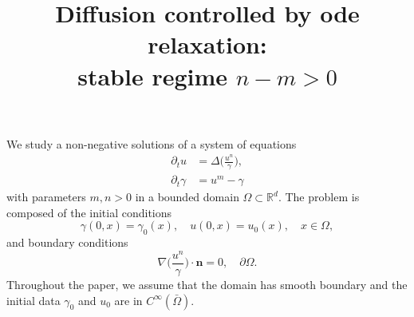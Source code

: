 \documentclass[a4paper,11pt]{article}
\theoremstyle{remark}
\begin{document}
\title{Diffusion controlled by ode relaxation:\\stable regime $n-m>0$}
\date{}

\maketitle

\renewcommand{\thefootnote}{\arabic{footnote}}

\maketitle

\begin{abstract}
\end{abstract}

\tableofcontents
\pagebreak 
 
We study a non-negative solutions of a system of equations
\begin{equation}\label{ug_system}
\begin{aligned}
 \partial_t u &= \Delta \Big(\frac{u^n}{\gamma}\Big),\\
 \partial_t \gamma &= u^m - \gamma
\end{aligned}
\end{equation}
with parameters $m,n>0$ in a bounded domain $\Omega\subset \mathbb{R}^d$. The problem is composed of the initial conditions
\begin{equation}
 \gamma(0,x)=\gamma_0(x), \quad u(0,x)=u_0(x), \quad x\in \Omega,
\end{equation}
and boundary conditions
\begin{equation}
 \nabla\Big(\frac{u^n}{\gamma}\Big)\cdot \mathbf{n} = 0, \quad \partial\Omega. \label{bdrycond}
\end{equation}
Throughout the paper, we assume that the domain has smooth boundary and the initial data $\gamma_0$ and $u_0$ are in $C^\infty(\bar\Omega)$. 
\end{document}

